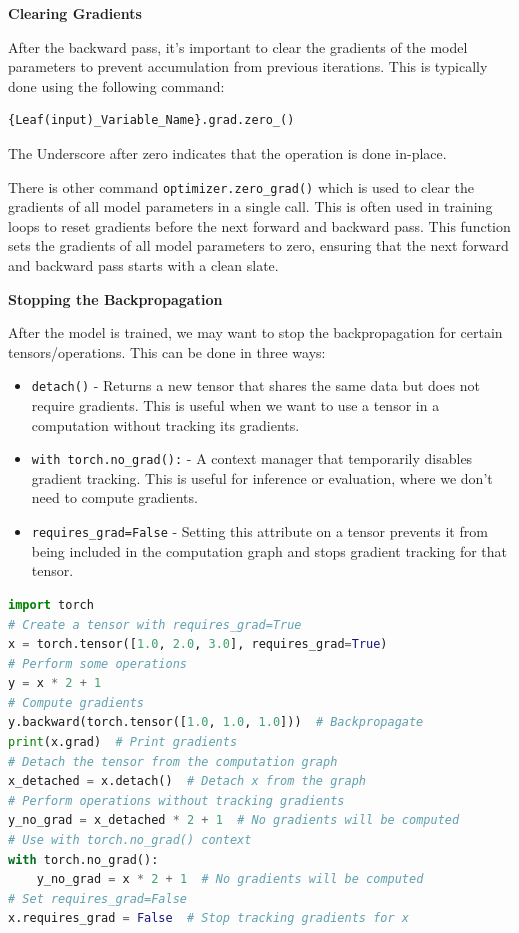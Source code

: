 \documentclass[12pt, a4paper]{article}
\begin{document}
\vspace{1em}

\textbf{Clearing Gradients}

After the backward pass, it's important to clear the gradients of the model parameters to prevent accumulation from previous iterations. This is typically done using the following command:

\begin{verbatim}
{Leaf(input)_Variable_Name}.grad.zero_()
\end{verbatim}

The Underscore after zero indicates that the operation is done in-place. 

There is other command \texttt{optimizer.zero\_grad()} which is used to clear the gradients of all model parameters in a single call. This is often used in training loops to reset gradients before the next forward and backward pass.
This function sets the gradients of all model parameters to zero, ensuring that the next forward and backward pass starts with a clean slate.

\textbf{Stopping the Backpropagation}

After the model is trained, we may want to stop the backpropagation for certain tensors/operations. This can be done in three ways:

\begin{itemize}[nosep]
    \item \texttt{detach()} - Returns a new tensor that shares the same data but does not require gradients. This is useful when we want to use a tensor in a computation without tracking its gradients.
    \item \texttt{with torch.no\_grad():} - A context manager that temporarily disables gradient tracking. This is useful for inference or evaluation, where we don't need to compute gradients.
    \item \texttt{requires\_grad=False} - Setting this attribute on a tensor prevents it from being included in the computation graph and stops gradient tracking for that tensor.
\end{itemize}

\begin{lstlisting}[language=Python]
import torch
# Create a tensor with requires_grad=True
x = torch.tensor([1.0, 2.0, 3.0], requires_grad=True)
# Perform some operations
y = x * 2 + 1
# Compute gradients
y.backward(torch.tensor([1.0, 1.0, 1.0]))  # Backpropagate
print(x.grad)  # Print gradients
# Detach the tensor from the computation graph
x_detached = x.detach()  # Detach x from the graph
# Perform operations without tracking gradients
y_no_grad = x_detached * 2 + 1  # No gradients will be computed
# Use with torch.no_grad() context
with torch.no_grad():
    y_no_grad = x * 2 + 1  # No gradients will be computed
# Set requires_grad=False
x.requires_grad = False  # Stop tracking gradients for x
\end{lstlisting}
\end{document}
